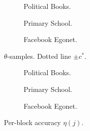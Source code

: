 \begin{figure}[!h]
	\centering
	\begin{minipage}{0.42\linewidth}
		\centering
		\begin{subfigure}{\linewidth}
			\centering
			\caption{Political Books.}
			\label{fig:polbooks-null}
		\end{subfigure}
		
		\begin{subfigure}{\linewidth}
			\centering
			\caption{Primary School.}
			\label{fig:school-null}
		\end{subfigure}
		
		\begin{subfigure}{\linewidth}
			\centering
			\caption{Facebook Egonet.}
			\label{fig:fb-null}
		\end{subfigure}
		\caption{$\theta$-samples. Dotted line $\pm c^*$.}
	\end{minipage}
	\begin{minipage}{0.42\linewidth}
		\centering
		\begin{subfigure}[t]{\linewidth}
			\centering
			\caption{Political Books.}
			\label{fig:polbooks-accuracy}
		\end{subfigure}
		
		\begin{subfigure}{\linewidth}
			\centering
			\caption{Primary School.}
			\label{fig:school-accuracy}
		\end{subfigure}
		
		\begin{subfigure}{\linewidth}
			\centering
			\caption{Facebook Egonet.}
			\label{fig:fb-accuracy}
		\end{subfigure}
		\caption{Per-block accuracy $\eta(j)$.}
	\end{minipage}
\end{figure}